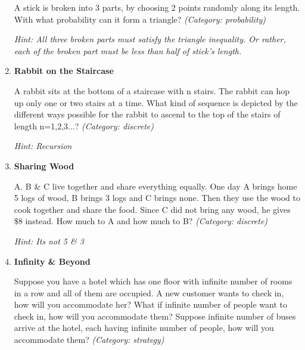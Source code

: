 \begin{enumerate}
A stick is broken into 3 parts, by choosing 2 points randomly along its length. With what probability can it form a triangle?
\small\emph{(Category: probability)}

\small\emph{Hint: All three broken parts must satisfy the triangle inequality. Or rather, each of the broken part must be less than half of stick's length.}





\item \textbf{Rabbit on the Staircase}

A rabbit sits at the bottom of a staircase with n stairs. The rabbit can hop up only one or two stairs at a time. What kind of sequence is depicted by the different ways possible for the rabbit to ascend to the top of the stairs of length n=1,2,3...?
\small\emph{(Category: discrete)}

\small\emph{Hint: Recursion}





\item \textbf{Sharing Wood}

A. B \& C live together and share everything equally. One day A brings home 5 logs of wood, B brings 3 logs and C brings none. Then they use the wood to cook together and share the food. Since C did not bring any wood, he gives \$8 instead. How much to A and how much to B?
\small\emph{(Category: discrete)}

\small\emph{Hint: Its not 5 \& 3}





\item \textbf{Infinity \& Beyond}

Suppose you have a hotel which has one floor with infinite number of rooms in a row and all of them are occupied.
A new customer wants to check in, how will you accommodate her?
What if infinite number of people want to check in, how will you accommodate them?
Suppose infinite number of buses arrive at the hotel, each having infinite number of people, how will you accommodate them?
\small\emph{(Category: strategy)}


\end{enumerate}
